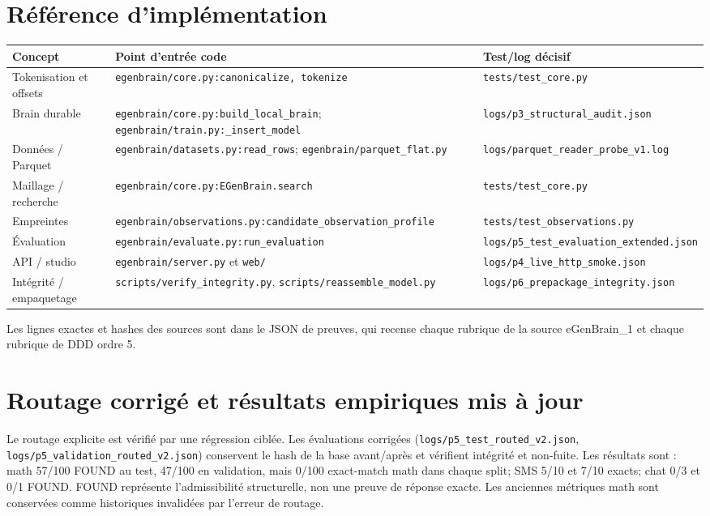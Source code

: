 \documentclass[11pt,a4paper,openany]{book}
\begin{document}
\chapter{Référence d'implémentation}
\begin{longtable}{p{.25\linewidth}p{.37\linewidth}p{.26\linewidth}}
\toprule Concept & Point d'entrée code & Test/log décisif\\\midrule
Tokenisation et offsets & \texttt{egenbrain/core.py:canonicalize, tokenize} & \texttt{tests/test\_core.py}\\
Brain durable & \texttt{egenbrain/core.py:build\_local\_brain}; \texttt{egenbrain/train.py:\_insert\_model} & \texttt{logs/p3\_structural\_audit.json}\\
Données / Parquet & \texttt{egenbrain/datasets.py:read\_rows}; \texttt{egenbrain/parquet\_flat.py} & \texttt{logs/parquet\_reader\_probe\_v1.log}\\
Maillage / recherche & \texttt{egenbrain/core.py:EGenBrain.search} & \texttt{tests/test\_core.py}\\
Empreintes & \texttt{egenbrain/observations.py:candidate\_observation\_profile} & \texttt{tests/test\_observations.py}\\
Évaluation & \texttt{egenbrain/evaluate.py:run\_evaluation} & \texttt{logs/p5\_test\_evaluation\_extended.json}\\
API / studio & \texttt{egenbrain/server.py} et \texttt{web/} & \texttt{logs/p4\_live\_http\_smoke.json}\\
Intégrité / empaquetage & \texttt{scripts/verify\_integrity.py}, \texttt{scripts/reassemble\_model.py} & \texttt{logs/p6\_prepackage\_integrity.json}\\
\bottomrule
\end{longtable}
Les lignes exactes et hashes des sources sont dans le JSON de preuves, qui recense chaque rubrique de la source eGenBrain_1 et chaque rubrique de DDD ordre 5.

\chapter{Routage corrigé et résultats empiriques mis à jour}
Le routage explicite est vérifié par une régression ciblée. Les évaluations corrigées (\texttt{logs/p5\_test\_routed\_v2.json}, \texttt{logs/p5\_validation\_routed\_v2.json}) conservent le hash de la base avant/après et vérifient intégrité et non-fuite. Les résultats sont : math 57/100 FOUND au test, 47/100 en validation, mais 0/100 exact-match math dans chaque split; SMS 5/10 et 7/10 exacts; chat 0/3 et 0/1 FOUND. FOUND représente l'admissibilité structurelle, non une preuve de réponse exacte. Les anciennes métriques math sont conservées comme historiques invalidées par l'erreur de routage.
\end{document}
